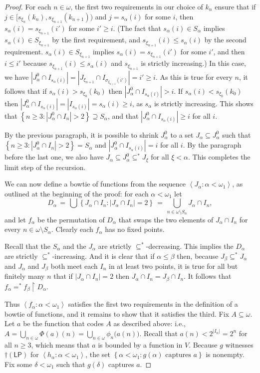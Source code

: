 \documentclass[11pt,leqno]{amsart}
\theoremstyle{definition}
\theoremstyle{remark}
\newcommand{\explicitSet}[1]{\left\lbrace #1 \right\rbrace}
\newcommand{\brackets}[1]{\left\langle #1 \right\rangle}
\newcommand{\set}[2]{\explicitSet{#1 \colon #2}}
\newcommand{\seq}[2]{\brackets{#1 \colon #2}}
\newcommand{\<}{\langle}
\renewcommand{\>}{\rangle}
\renewcommand{\a}{\alpha}
\renewcommand{\b}{\beta}
\newcommand{\dlt}{\delta}
\newcommand{\s}{\sigma}
\newcommand{\w}{\omega}
\newcommand{\0}{\emptyset}
\newcommand{\sub}{\subseteq}
\newcommand{\rest}{\!\restriction\!}
\newcommand{\card}[1]{\left\lvert #1 \right\rvert}
\newcommand{\1}{1\hspace{-1.75mm}1}
\newcommand{\cLP}{\dagger(\mathsf{LP})}
\begin{document}
\begin{proof}
For each $n \in \w$, the first two requirements in our choice of $k_n$ ensure that if $j \in \big[ s_{\xi_n}(k_n),s_{\xi_{n+1}}(k_{n+1}) \big)$ and $j = s_\a(i)$ for some $i$, then $s_\a(i) = s_{\xi_{n+1}}(i')$ for some $i' \geq i$. (The fact that $s_\a(i) \in S_\a$ implies $s_\a(i) \in S_{\xi_{n+1}}$ by the first requirement, and $s_{\xi_{n+1}}(i) \leq s_\a(i)$ by the second requirement. $s_\a(i) \in S_{\xi_{n+1}}$ implies $s_\a(i) = s_{\xi_{n+1}}(i')$ for some $i'$, and then $i \leq i'$ because $s_{\xi_{n+1}}(i) \leq s_\a(i)$ and $s_{\xi_{n+1}}$ is strictly increasing.) 
In this case, we have $|J^0_\a \cap I_{s_\a(i)}| = |J_{\xi_{n+1}} \cap I_{\s_{\xi_{n+1}}(i')}| = i' \geq i$. 
As this is true for every $n$, it follows that if $s_\a(i) > s_{\xi_0}(k_0)$ then $|J^0_\a \cap I_{s_\a(i)}| > i$. If $s_\a(i) < s_{\xi_0}(k_0)$ then $|J^0_\a \cap I_{s_\a(i)}| = |I_{s_\a(i)}| = s_\a(i) \geq i$, as $s_\a$ is strictly increasing. This shows that $\set{n \geq 3}{|J_\a^0 \cap I_n| > 2} \supseteq S_\a$, and that 
$|J_\a^0 \cap I_{s_\a(i)}| \geq i$ for all $i$. 

By the previous paragraph, it is possible to shrink $J_\a^0$ to a set $J_\a \sub J_\a^0$ such that 
$\set{n \geq 3}{|J_\a^0 \cap I_n| > 2} = S_\a$ and 
$|J_\a^0 \cap I_{s_\a(i)}| = i$ for all $i$. 
By the paragraph before the last one, we also have $J_\a \sub J^0_\a \sub^* J_\xi$ for all $\xi < \a$. 
This completes the limit step of the recursion. 

We can now define a bowtie of functions from the sequence $\seq{J_\a}{\a < \w_1}$, as outlined at the beginning of the proof: for each $\a < \w_1$ let 
$$D_\a \,=\, \textstyle \bigcup \set{J_\a \cap I_n}{\card{J_\a \cap I_n} = 2} \,=\, \bigcup_{n \in \w \setminus S_\a}J_\a \cap I_n,$$
and let $f_\a$ be the permutation of $D_\a$ that swaps the two elements of $J_\a \cap I_n$ for every $n \in \w \setminus S_\a$. Clearly each $f_\a$ has no fixed points. 

Recall that the $S_\a$ and the $J_\a$ are strictly $\sub^*$-decreasing. 
This implies the $D_\a$ are strictly $\sub^*$-increasing. 
And it is clear that if $\a \leq \b$ then, because $J_\b \sub^* J_\a$ and $J_\a$ and $J_\b$ both meet each $I_n$ in at least two points, it is true for all but finitely many $n$ that if $|J_\a \cap I_n| = 2$ then $J_\a \cap I_n = J_\b \cap I_n$. It follows that $f_\a =^* f_\b \rest D_\a$. 

Thus $\seq{f_\a}{\a < \w_1}$ satisfies the first two requirements in the definition of a bowtie of functions, and it remains to show that it satisfies the third. 
Fix $A \sub \w$. 
Let $a$ be the function that codes $A$ as described above: i.e., $A = \bigcup_{n \in \w}\Phi(a)(n) = \bigcup_{n \in \w}\phi_n\big(a(n)\big)$. 
Recall that $a(n) < 2^{|I_n|} = 2^n$ for all $n \geq 3$, which means that $a$ is bounded by a function in $V$. 
Because $g$ witnesses $\cLP$ for $\seq{h_\a}{\a < \w_1}$, the set 
$\set{\a < \w_1}{g(\a) \text{ captures } a}$ is nonempty. 
Fix some $\dlt < \w_1$ such that $g(\dlt)$ captures $a$. 


\end{proof}
\end{document}
